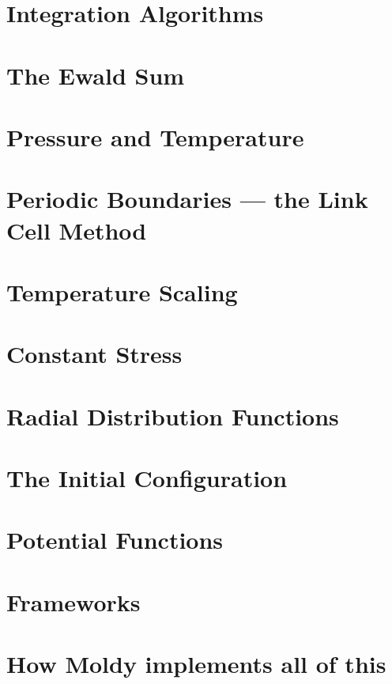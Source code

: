 \section{Integration Algorithms}
\section{The Ewald Sum}
\label{sec:ewald}
\section{Pressure and Temperature}
\section{Periodic Boundaries --- the Link Cell Method}
\label{sec:link-cell}
\section{Temperature Scaling}
\label{sec:rescaling}
\section{Constant Stress}
\label{sec:const-stress}
\section{Radial Distribution Functions}
\section{The Initial Configuration}
\label{sec:skewstart}
\section{Potential Functions}
\section{Frameworks}
\section{How Moldy implements all of this}


